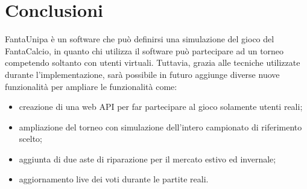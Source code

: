 \documentclass[12pt,a4paper]{article}
\begin{document}
\section{Conclusioni}
FantaUnipa è un software che può definirsi una simulazione del gioco del FantaCalcio, in quanto chi utilizza il software può partecipare ad un torneo competendo soltanto con utenti virtuali. Tuttavia, grazia alle tecniche utilizzate durante l'implementazione, sarà possibile in futuro aggiunge diverse nuove funzionalità per ampliare le funzionalità come:
\begin{itemize}
\item creazione di una web API per far partecipare al gioco solamente utenti reali;
\item ampliazione del torneo con simulazione dell'intero campionato di riferimento scelto;
\item aggiunta di due aste di riparazione per il mercato estivo ed invernale;
\item aggiornamento live dei voti durante le partite reali.
\end{itemize}
\end{document}
